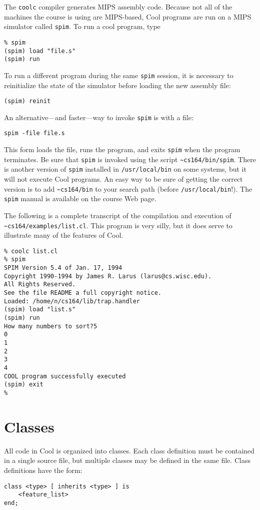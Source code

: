 The {\tt coolc} compiler generates MIPS assembly code.  Because not
all of the machines the course is using are MIPS-based, Cool
programs are run on a MIPS simulator called {\tt spim}.  To run a cool
program, type
\begin{verbatim}
% spim
(spim) load "file.s"
(spim) run
\end{verbatim}
To run a different program during the same {\tt spim} session, it is
necessary to reinitialize the state of the simulator before loading the
new assembly file:
\begin{verbatim}
(spim) reinit
\end{verbatim}
An alternative---and faster---way to invoke {\tt spim} is with a file:
\begin{verbatim}
spim -file file.s
\end{verbatim}
This form loads the file, runs the program, and exits {\tt spim} when 
the program terminates.
Be sure that {\tt spim} is invoked using the script {\tt \~{ }cs164/bin/spim}.
There is another version of {\tt spim} installed in {\tt /usr/local/bin} on
some systems, but it will not execute Cool programs.  An easy way to be sure
of getting the correct version is to add {\tt \~{ }cs164/bin} to your search
path (before {\tt /usr/local/bin}!).  The {\tt spim} manual is available
on the course Web page.

The following is a complete transcript of the compilation and
execution of {\tt \~{ }cs164/examples/list.cl}.  This program is very
silly, but it does serve to illustrate many of the features of
Cool.

\begin{verbatim}
% coolc list.cl
% spim
SPIM Version 5.4 of Jan. 17, 1994
Copyright 1990-1994 by James R. Larus (larus@cs.wisc.edu).
All Rights Reserved.
See the file README a full copyright notice.
Loaded: /home/n/cs164/lib/trap.handler
(spim) load "list.s"
(spim) run
How many numbers to sort?5
0
1
2
3
4
COOL program successfully executed
(spim) exit
% 
\end{verbatim}

\section{Classes}

All code in Cool is organized into classes.  Each class definition must be
contained in a single source file, but multiple classes may be defined in the
same file.  Class definitions have the form:

\begin{verbatim}
class <type> [ inherits <type> ] is
    <feature_list>
end;
\end{verbatim}

